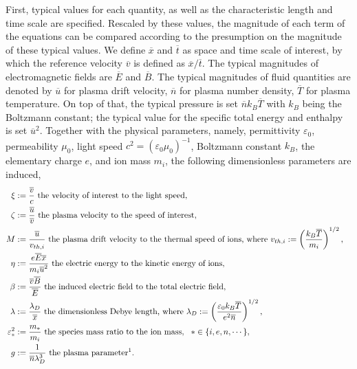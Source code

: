 \documentclass{report}
\begin{document}
First, typical values for each quantity, as well as the characteristic length and time scale are specified. Rescaled by these values, the magnitude of each term of the equations can be compared according to the presumption on the magnitude of these typical values. We define $\overline{x}$ and $\overline{t}$ as space and time scale of interest, by which the reference velocity $\overline{v}$ is defined as $\overline{x}/\overline{t}$. The typical magnitudes of electromagnetic fields are $\overline{E}$ and $\overline{B}$. The typical magnitudes of fluid quantities are denoted by $\overline{u}$ for plasma drift velocity, $\overline{n}$ for plasma number density, $\overline{T}$ for plasma temperature. On top of that, the typical pressure is set $\overline{n}k_B\overline{T}$ with $k_B$ being the Boltzmann constant; the typical value for the specific total energy and enthalpy is set $\overline{u}^2$. Together with the physical parameters, namely, permittivity $\varepsilon_0$, permeability $\mu_0$, light speed $c^2 = (\varepsilon_0\mu_0)^{-1}$, Boltzmann constant $k_B$, the elementary charge $e$, and ion mass $m_i$, the following dimensionless parameters are induced,
\begin{align*} 
    \xi &:= \frac{\overline{v}}{c} \text{ the velocity of interest to the light speed}, &\\
    \zeta &:= \frac{\overline{u}}{\overline{v}} \text{ the plasma velocity to the speed of interest}, &\\
    M &:= \frac{\overline{u}}{v_{th,i}} \text{ the plasma drift velocity to the thermal speed of ions, where } v_{th,i} := \left(\frac{k_B \overline{T}}{m_i}\right)^{1/2}, &\\
    \eta &:= \frac{e\overline{E}\overline{x}}{m_i\overline{u}^2} \text{ the electric energy to the kinetic energy of ions}, &\\
    \beta &:= \frac{\overline{v}\overline{B}}{\overline{E}} \text{ the induced electric field to the total electric field}, &\\
    \lambda &:= \frac{\lambda_D}{\overline{x}} \text{ the dimensionless Debye length, where }\lambda_D := \left(\frac{\varepsilon_0k_B\overline{T}}{e^2\overline{n}}\right)^{1/2}, &\\
    \varepsilon_*^2 &:= \frac{m_*}{m_i} \text{ the species mass ratio to the ion mass},\ \  * \in \{i,e,n,\cdots\}, &\\
    g &:= \frac{1}{\overline{n}\lambda_D^3} \text{ the plasma parameter\footnotemark}.&
\end{align*}
\end{document}
